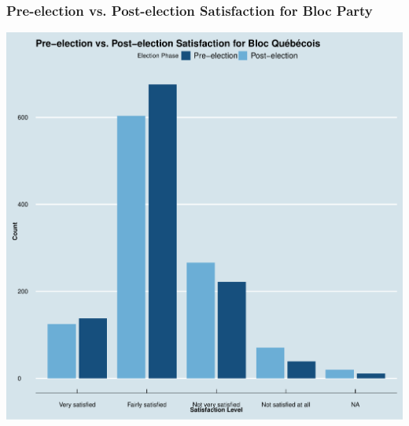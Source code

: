 \documentclass{beamer}
\begin{document}
\begin{frame}
    \frametitle{Pre-election vs. Post-election Satisfaction for Bloc Party}
    \begin{center}
        \includegraphics[scale=0.3]{Pre-election vs. Post-election Satisfaction for Block.pdf}
    \end{center}
\end{frame}

\end{document}
